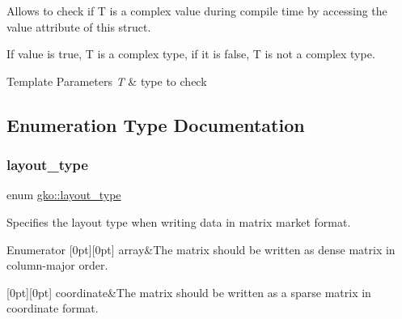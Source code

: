 Allows to check if T is a complex value during compile time by accessing the {\ttfamily value} attribute of this struct. 

If {\ttfamily value} is {\ttfamily true}, T is a complex type, if it is {\ttfamily false}, T is not a complex type.


\begin{DoxyTemplParams}{Template Parameters}
{\em T} & type to check \\
\hline
\end{DoxyTemplParams}


\subsection{Enumeration Type Documentation}
\mbox{\label{namespacegko_ae749a5ea11a93c1bcc9158d9a6e9fb68}} 
\subsubsection{\texorpdfstring{layout\+\_\+type}{layout\_type}}
{\footnotesize\ttfamily enum \hyperlink{namespacegko_ae749a5ea11a93c1bcc9158d9a6e9fb68}{gko\+::layout\+\_\+type}\hspace{0.3cm}{\ttfamily [strong]}}



Specifies the layout type when writing data in matrix market format. 

\begin{DoxyEnumFields}{Enumerator}
[0pt][0pt]{}\mbox{\label{namespacegko_ae749a5ea11a93c1bcc9158d9a6e9fb68af1f713c9e000f5d3f280adbd124df4f5}} 
array&The matrix should be written as dense matrix in column-\/major order. \\
\hline

[0pt][0pt]{}\mbox{\label{namespacegko_ae749a5ea11a93c1bcc9158d9a6e9fb68af5d7aa3ba4929cc12dc51a92c59fabd3}} 
coordinate&The matrix should be written as a sparse matrix in coordinate format. \\
\hline

\end{DoxyEnumFields}


